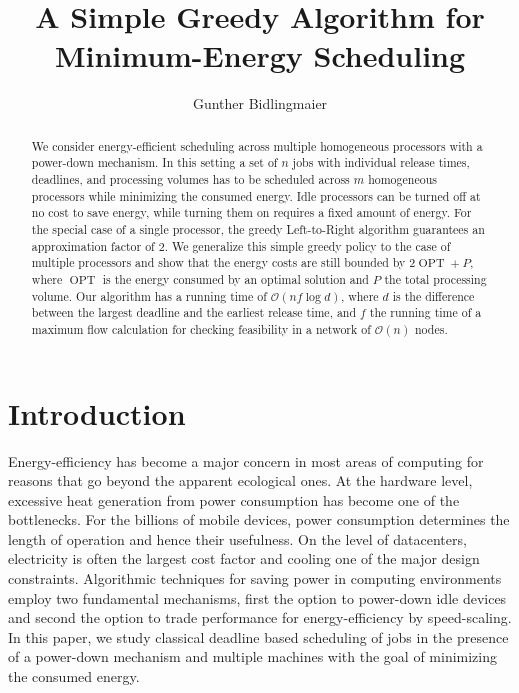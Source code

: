 \documentclass[a4paper]{article}
\title{A Simple Greedy Algorithm for Minimum-Energy Scheduling}
\author{Gunther Bidlingmaier}
\DeclareMathOperator{\OPT}{OPT}
\begin{document}
%

\maketitle
\begin{abstract}
  We consider energy-efficient scheduling across multiple homogeneous processors with a power-down mechanism.
  In this setting a set of $n$ jobs with individual release times, deadlines, and processing volumes has to be scheduled across $m$ homogeneous processors while minimizing the consumed energy.
  Idle processors can be turned off at no cost to save energy, while turning them on requires a fixed amount of energy.
  For the special case of a single processor, the greedy Left-to-Right algorithm guarantees an approximation factor of $2$.
  We generalize this simple greedy policy to the case of multiple processors and show that the energy costs are still bounded by $2 \OPT + P$, where $\OPT$ is the energy consumed by an optimal solution and $P$ the total processing volume.
  Our algorithm has a running time of $\mathcal{O}(n f \log d)$, where $d$ is the difference between the largest deadline and the earliest release time, and $f$ the running time of a maximum flow calculation for checking feasibility in a network of $\mathcal{O}(n)$ nodes.
\end{abstract}
\clearpage


\section{Introduction}
Energy-efficiency has become a major concern in most areas of computing for reasons that go beyond the apparent ecological ones.
At the hardware level, excessive heat generation from power consumption has become one of the bottlenecks.
For the billions of mobile devices, power consumption determines the length of operation and hence their usefulness.
On the level of datacenters, electricity is often the largest cost factor and cooling one of the major design constraints.
Algorithmic techniques for saving power in computing environments employ two fundamental mechanisms, first the option to power-down idle devices and second the option to trade performance for energy-efficiency by speed-scaling.
In this paper, we study classical deadline based scheduling of jobs in the presence of a power-down mechanism and multiple machines with the goal of minimizing the consumed energy.
\end{document}
